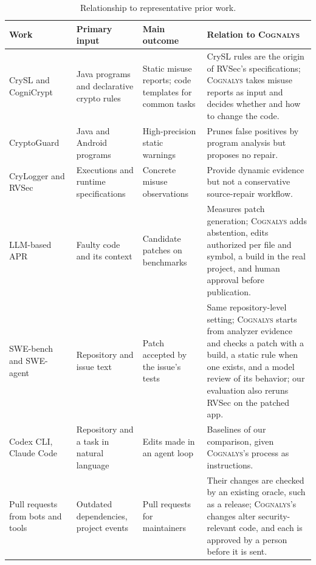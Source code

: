 \documentclass[conference]{IEEEtran}
\newcommand{\system}{\textsc{Cognalys}}
\begin{document}
\begin{table}[t]
\centering
\caption{Relationship to representative prior work.}
\label{tab:related}
\footnotesize
\begin{tabular}{p{2.9cm}p{3.1cm}p{3.4cm}p{6.0cm}}
\toprule
Work & Primary input & Main outcome & Relation to \system \\
\midrule
CrySL and CogniCrypt~\cite{krueger2017cognicrypt,krueger2021crysl} &
Java programs and declarative crypto rules & Static misuse reports; code
templates for common tasks & CrySL rules are the origin of RVSec's
specifications; \system{} takes misuse reports as input and decides whether
and how to change the code. \\
CryptoGuard~\cite{rahaman2019cryptoguard} & Java and Android programs &
High-precision static warnings & Prunes false positives by program analysis
but proposes no repair. \\
CryLogger and RVSec~\cite{piccolboni2021crylogger,
torres2023runtime} & Executions and runtime specifications & Concrete misuse
observations & Provide dynamic evidence but not a conservative source-repair
workflow. \\
LLM-based APR~\cite{xia2023apr,zhang2023apimisuse} &
Faulty code and its context & Candidate patches on benchmarks & Measures patch
generation; \system{} adds abstention, edits authorized per file and symbol, a
build in the real project, and human approval before publication. \\
SWE-bench and SWE-agent~\cite{jimenez2024swebench,yang2024sweagent} &
Repository and issue text & Patch accepted by the issue's tests & Same
repository-level setting; \system{} starts from analyzer evidence and checks a
patch with a build, a static rule when one exists, and a model review of its
behavior; our evaluation also reruns RVSec on the patched app. \\
Codex CLI, Claude Code~\cite{openai2026codex,anthropic2026claudecode}
& Repository and a task in natural language & Edits made in an agent loop &
Baselines of our comparison, given \system{}'s process as instructions. \\
Pull requests from bots and tools~\cite{mirhosseini2017autopr,wessel2018bots,
wyrich2021botprs} & Outdated dependencies, project events & Pull requests for
maintainers & Their changes are checked by an existing oracle, such as a
release; \system{}'s changes alter security-relevant code, and each is
approved by a person before it is sent. \\
\bottomrule
\end{tabular}
\end{table}
\end{document}
